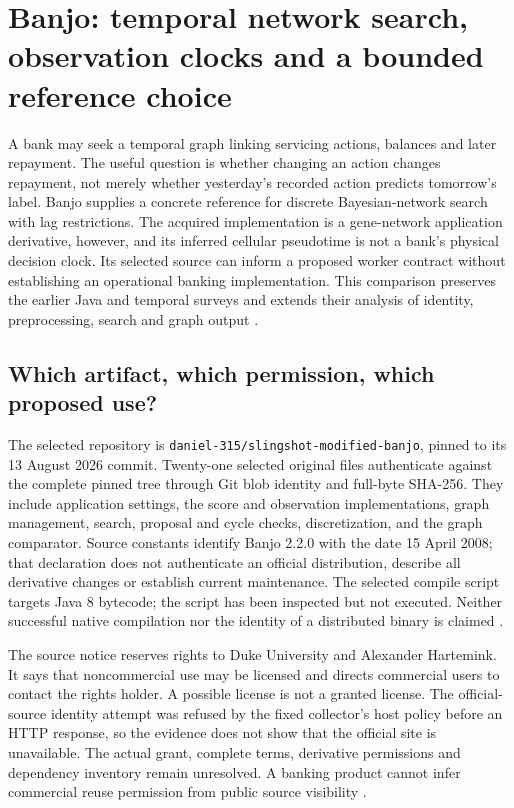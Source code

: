 \section{Banjo: temporal network search, observation clocks and a bounded reference choice}
\label{sec:exec24-banjo-reuse}

A bank may seek a temporal graph linking servicing actions, balances and later
repayment. The useful question is whether changing an action changes repayment,
not merely whether yesterday's recorded action predicts tomorrow's label.
Banjo supplies a concrete reference for discrete Bayesian-network search with
lag restrictions. The acquired implementation is a gene-network application
derivative, however, and its inferred cellular pseudotime is not a bank's
physical decision clock. Its selected source can inform a proposed worker
contract without establishing an operational banking implementation.
This comparison preserves the earlier Java and temporal surveys and extends
their analysis of identity, preprocessing, search and graph output
\cite{exec13_java_banjo,exec15_javatemporal_banjo,exec24_banjo_source}.

\subsection{Which artifact, which permission, which proposed use?}
The selected repository is \texttt{daniel-315/slingshot-modified-banjo}, pinned
to its 13 August 2026 commit. Twenty-one selected original files authenticate
against the complete pinned tree through Git blob identity and full-byte
SHA-256. They include application settings, the score and observation
implementations, graph management, search, proposal and cycle checks,
discretization, and the graph comparator. Source constants identify Banjo
2.2.0 with the date 15 April 2008; that declaration does not authenticate an
official distribution, describe all derivative changes or establish current
maintenance. The selected compile script targets Java 8 bytecode; the script
has been inspected but not executed. Neither successful native compilation nor
the identity of a distributed binary is claimed \cite{exec24_banjo_source}.

The source notice reserves rights to Duke University and Alexander Hartemink.
It says that noncommercial use may be licensed and directs commercial users
to contact the rights holder. A possible license is not a granted license.
The official-source identity attempt was refused by the fixed collector's
host policy before an HTTP response, so the evidence does not show that the
official site is unavailable. The actual grant, complete terms, derivative
permissions and dependency inventory remain unresolved. A banking product
cannot infer commercial reuse permission from public source visibility
\cite{exec24_banjo_source,exec24_banjo_choice}.

